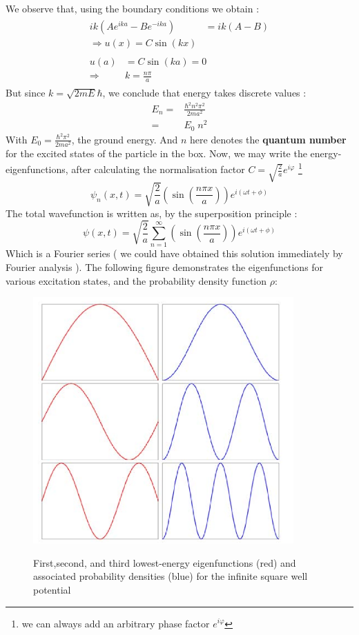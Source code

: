 We observe that, using the boundary conditions we obtain :
\begin{gather}
\begin{align}
ik\left( A e^ {ika} - Be^{-ika} \right)  &= ik (A-B) \nonumber \\
\Rightarrow u(x) = C \sin (kx)
\end{align}
\\
\begin{align}
u(a)& =C\sin(ka) =0  \nonumber \\
\Rightarrow & k = \frac{n \pi}{a}
\end{align}
\end{gather}
But since $ k = \sqrt{2mE}\hbar $, we conclude that energy takes discrete values :
\begin{align}
E_n =& \frac{\hbar^ 2 n^ 2 \pi ^2 }{2m a ^2 } \nonumber \\
=& E_0 \;  n^ 2 
\end{align}
With $ E_0 = \frac{\hbar^ 2  \pi ^2 }{2m a ^2 }$, the ground energy. And $ n$ here denotes the \textbf{quantum number } for the excited states of the particle in the box. Now, we may write the energy-eigenfunctions, after calculating the normalisation factor $ C = \sqrt{\frac{2}{a}} e^{i\varphi}$ \footnote{ we can always add  an arbitrary phase factor $e^{i\varphi}$}
\begin{equation}
\psi_n(x,t) = \sqrt{\frac{2}{a}} \left( \sin(\frac{n \pi x}{a})\right) e^ { i\left( \omega t+\phi\right) }
\end{equation}
The total wavefunction is written as, by the superposition principle :
\begin{equation}
\psi (x,t) = \sqrt{\frac{2}{a}}\sum _{n=1}^ { \infty} \left( \sin(\frac{n \pi x}{a})\right) e^ { i\left( \omega t+\phi\right) }
\end{equation}
Which is a Fourier series ( we could have obtained this solution immediately by Fourier analysis ).
The following figure demonstrates the eigenfunctions for various excitation states, and the probability density function $ \rho$:
\begin{figure}
	\centering
	\includegraphics[scale =0.5]{./figures/states}
	\label{s}
	\caption{ First,second, and	third lowest-energy	eigenfunctions (red) and associated probability densities (blue) for the infinite	square well	potential}
\end{figure}
